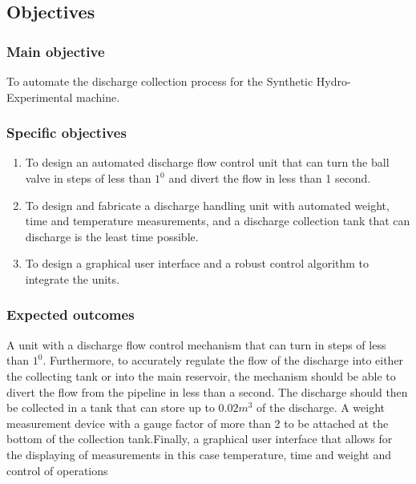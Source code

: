 \subsection{Objectives}
\subsubsection{Main objective}

 To automate the discharge collection process for the Synthetic Hydro-Experimental machine. 

\subsubsection{Specific objectives}

\begin{enumerate}
	\item To design an automated discharge flow control unit that can turn the ball valve in steps of less than $1^{0}$ and divert the flow in less than 1 second.
	\item To design and fabricate a discharge handling unit with automated weight, time and temperature measurements, and a discharge collection tank that can discharge is the least time possible.
    \item To design a graphical user interface and a robust control algorithm to integrate the units.

\end{enumerate}

\subsubsection{Expected outcomes}
A unit with a discharge flow control mechanism that can turn in steps of less than $1^{0}$. Furthermore, to accurately regulate the flow of the discharge into either the collecting tank or into the main reservoir, the mechanism should be able to divert the flow from the pipeline in less than a second. The discharge should then be collected in a  tank that can store up to $0.02m^{3}$ of the discharge. A weight measurement device with a gauge factor of more than 2 to be attached at the bottom of the collection tank.Finally, a graphical user interface that allows for the displaying of measurements in this case temperature, time and weight and control of operations

